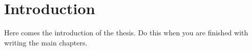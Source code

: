 \chapter*{Introduction}
{}

Here comes the introduction of the thesis. Do this when you are finished with writing the main chapters.
